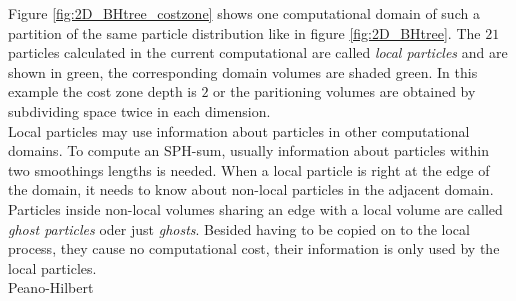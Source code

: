 Figure \ref{fig:2D_BHtree_costzone} shows one computational domain of such a partition of the same particle distribution like in figure \ref{fig:2D_BHtree}. The $21$ particles calculated in the current computational are called \emph{local particles} and are shown in green, the corresponding domain volumes are shaded green. In this example the cost zone depth is $2$ or the paritioning volumes are obtained by subdividing space twice in each dimension. \\
Local particles may use information about particles in other computational domains. To compute an SPH-sum, usually information about particles within two smoothings lengths is needed. When a local particle is right at the edge of the domain, it needs to know about non-local particles in the adjacent domain. Particles inside non-local volumes sharing an edge with a local volume are called \emph{ghost particles} oder just \emph{ghosts}. Besided having to be copied on to the local process, they cause no computational cost, their information is only used by the local particles.\\

Peano-Hilbert

